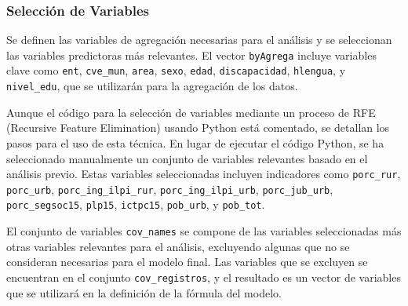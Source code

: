 \documentclass[
  12pt,
]{book}
\begin{document}
\hypertarget{selecciuxf3n-de-variables-2}{%
\subsubsection*{Selección de Variables}\label{selecciuxf3n-de-variables-2}}

Se definen las variables de agregación necesarias para el análisis y se seleccionan las variables predictoras más relevantes. El vector \texttt{byAgrega} incluye variables clave como \texttt{ent}, \texttt{cve\_mun}, \texttt{area}, \texttt{sexo}, \texttt{edad}, \texttt{discapacidad}, \texttt{hlengua}, y \texttt{nivel\_edu}, que se utilizarán para la agregación de los datos.

Aunque el código para la selección de variables mediante un proceso de RFE (Recursive Feature Elimination) usando Python está comentado, se detallan los pasos para el uso de esta técnica. En lugar de ejecutar el código Python, se ha seleccionado manualmente un conjunto de variables relevantes basado en el análisis previo. Estas variables seleccionadas incluyen indicadores como \texttt{porc\_rur}, \texttt{porc\_urb}, \texttt{porc\_ing\_ilpi\_rur}, \texttt{porc\_ing\_ilpi\_urb}, \texttt{porc\_jub\_urb}, \texttt{porc\_segsoc15}, \texttt{plp15}, \texttt{ictpc15}, \texttt{pob\_urb}, y \texttt{pob\_tot}.

El conjunto de variables \texttt{cov\_names} se compone de las variables seleccionadas más otras variables relevantes para el análisis, excluyendo algunas que no se consideran necesarias para el modelo final. Las variables que se excluyen se encuentran en el conjunto \texttt{cov\_registros}, y el resultado es un vector de variables que se utilizará en la definición de la fórmula del modelo.
\end{document}
